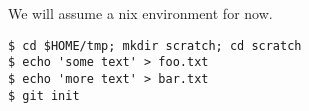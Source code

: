 
We will assume a \*nix environment for now.

\begin{verbatim}
$ cd $HOME/tmp; mkdir scratch; cd scratch
$ echo 'some text' > foo.txt
$ echo 'more text' > bar.txt
$ git init
\end{verbatim} 

